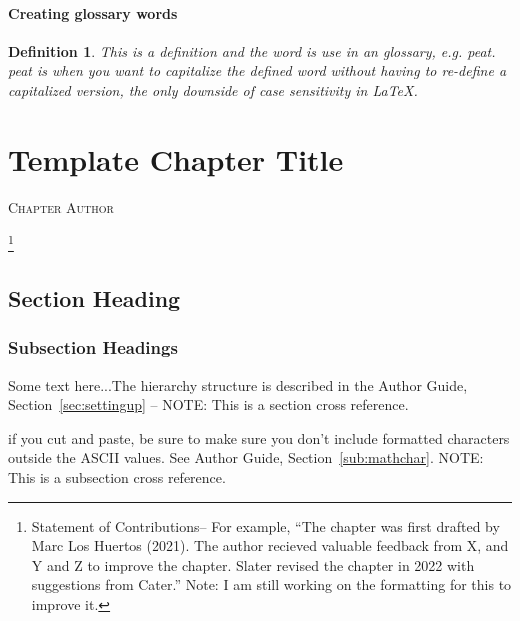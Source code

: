 \documentclass{book}\usepackage{knitr}
\makeatletter
\newtheorem{definition}[theorem]{Definition}
\newcommand{\chapterauthor}[1]{%
  {\parindent0pt\vspace*{-25pt}%
  \linespread{1.1}\large\scshape#1%
  \par\nobreak\vspace*{35pt}}
  \@afterheading%
}
\makeatother
\begin{document}

\subsubsection{Creating glossary words}
 

\begin{definition}
This is a definition and the word is use in an glossary, e.g. \gls{peat}. \Gls{peat} is when you want to capitalize the defined word without having to re-define a capitalized version, the only downside of case sensitivity in \LaTeX.
\end{definition}


\chapter{Template Chapter Title}\label{ch:template}

\chapterauthor{Chapter Author}

\footnote{Statement of Contributions-- For example, ``The chapter was first drafted by Marc Los Huertos (2021). The author recieved valuable feedback from X, and Y and Z to improve the chapter. Slater revised the chapter in 2022 with suggestions from Cater.'' Note: I am still working on the formatting for this to improve it.}

\section{Section Heading}%

\subsection{Subsection Headings} %

Some text here...The hierarchy structure is described in the Author Guide, Section~\ref{sec:settingup} -- NOTE: This is a section cross reference.

if you cut and paste, be sure to make sure you don't include formatted characters outside the ASCII values. See Author Guide, Section~\ref{sub:mathchar}. NOTE: This is a subsection cross reference.
\end{document}
